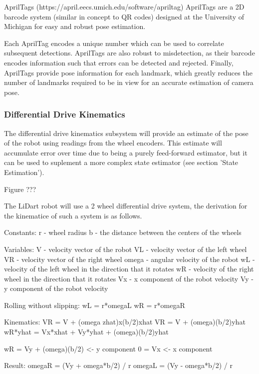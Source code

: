 \documentclass[12pt]{article}
\begin{document}
    AprilTags (https://april.eecs.umich.edu/software/apriltag)
        AprilTags are a 2D barcode system (similar in concept to QR codes) designed at the University of Michigan for easy and robust pose estimation.
        
        Each AprilTag encodes a unique number which can be used to correlate subsequent detections. AprilTags are also robust to misdetection, as their barcode encodes information such that errors can be detected and rejected. Finally, AprilTags provide pose information for each landmark, which greatly reduces the number of landmarks required to be in view for an accurate estimation of camera pose.

\subsubsection{Differential Drive Kinematics}
    The differential drive kinematics subsystem will provide an estimate of the pose of the robot using readings from the wheel encoders. This estimate will accumulate error over time due to being a purely feed-forward estimator, but it can be used to suplement a more complex state estimator (see section 'State Estimation').

    Figure ???

    The LiDart robot will use a 2 wheel differential drive system, the derivation for the kinematice of such a system is as follows.

    Constants:
    r - wheel radius
    b - the distance between the centers of the wheels

    Variables:
    V - velocity vector of the robot
    VL - velocity vector of the left wheel
    VR - velocity vector of the right wheel
    omega - angular velocity of the robot 
    wL - velocity of the left wheel in the direction that it rotates
    wR - velocity of the right wheel in the direction that it rotates
    Vx - x component of the robot velocity
    Vy - y component of the robot velocity

    Rolling without slipping:
    wL = r*omegaL
    wR = r*omegaR

    Kinematics:
    VR = V + (omega zhat)x(b/2)xhat
    VR = V + (omega)(b/2)yhat
    wR*yhat = Vx*xhat + Vy*yhat + (omega)(b/2)yhat
    
    wR = Vy + (omega)(b/2)  <- y component
    0 = Vx                  <- x component

    Result:
    omegaR = (Vy + omega*b/2) / r
    omegaL = (Vy - omega*b/2) / r
\end{document}
